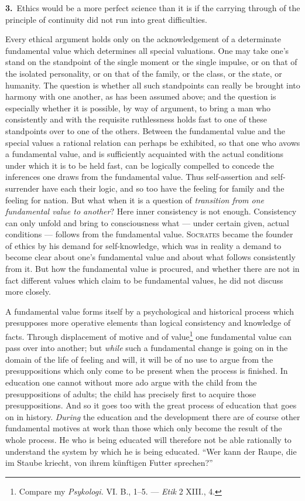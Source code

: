 \documentclass[12pt,a4paper]{book}
\newcommand{\opage}[1]{\marginnote{\footnotesize\textit{[#1]}}}
\begin{document}
\noindent\textbf{3.}~Ethics would be a more perfect science than it is if the
carrying through of the principle of continuity did not run into great
difficulties.

Every ethical argument holds only on the acknowledgement of a determinate
fundamental value which determines all special valuations. One may take one's
stand on the standpoint of the single moment or the single impulse, or on that of
the isolated personality, or on that of the family, or the class, or the state,
or humanity. The question is whether all such standpoints can really be brought
into harmony with one another, as has been assumed above; and the question is
especially whether it is possible, by way of argument, to bring a man who
consistently and with the requisite ruthlessness holds fast to one of these
standpoints over to one of the others. Between the fundamental value and the
special values a rational relation can perhaps be exhibited, so that one who
avows a fundamental value, and is sufficiently acquainted with the actual
conditions under which it is to be held fast, can be logically compelled to
concede the inferences one draws from the fundamental value. Thus self-assertion
and self-surrender have each their logic, and so too have the feeling for family
and the feeling for nation. But what when it is a question of \emph{transition
from one fundamental value to another}? Here inner consistency is not enough.
Consistency can only unfold and bring to consciousness what --- under certain
given, actual conditions --- follows from the fundamental value.
\textsc{Socrates} became the founder of ethics by his demand for self-knowledge,
which was in reality a demand to become clear about one's fundamental value and
about what follows consistently from it. But how the fundamental value is
procured, and whether there \opage{76}are not in fact different values which claim to be
fundamental values, he did not discuss more closely.

A fundamental value forms itself by a psychological and historical process which
presupposes more operative elements than logical consistency and knowledge of
facts. Through displacement of motive and of value\footnote{Compare my
\textit{Psykologi.} VI. B., 1--5. --- \textit{Etik} 2 XIII., 4.} one fundamental
value can pass over into another; but \emph{while} such a fundamental change is
going on in the domain of the life of feeling and will, it will be of no use to
argue from the presuppositions which only come to be present when the process is
finished. In education one cannot without more ado argue with the child from the
presuppositions of adults; the child has precisely first to acquire those
presuppositions. And so it goes too with the great process of education that goes
on in history. \emph{During} the education and the development there are of
course other fundamental motives at work than those which only become the result
of the whole process. He who is being educated will therefore not be able
rationally to understand the system by which he is being educated. ``Wer kann der
Raupe, die im Staube kriecht, von ihrem künftigen Futter sprechen?''
\end{document}
